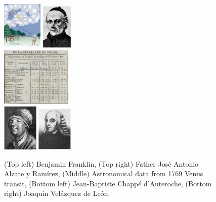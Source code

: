 \documentclass[10pt]{article}
\begin{document}
\begin{figure}[ht]
\centering
\includegraphics[width=0.17\textwidth]{figures/franklin.png}
\includegraphics[width=0.13\textwidth]{figures/alzate_ramirez.jpg} \\
\includegraphics[width=0.30\textwidth]{figures/1769_transit.png} \\
\includegraphics[width=0.15\textwidth]{figures/Abbot_dAuteroche.png}
\includegraphics[width=0.15\textwidth]{figures/joaquin_v_d_Leon.png}
\caption{\label{fig:franklin} \small (Top left) Benjamin Franklin, (Top right) Father Jos\'{e} Antonio Alzate y Ram\'{i}rez, (Middle) Astronomical data from 1769 Venus transit, (Bottom left) Jean-Baptiste Chapp\'{e} d'Auteroche, (Bottom right) Joaqu\'{i}n Vel\'{a}zquez de Le\'{o}n.}
\end{figure}
\end{document}
